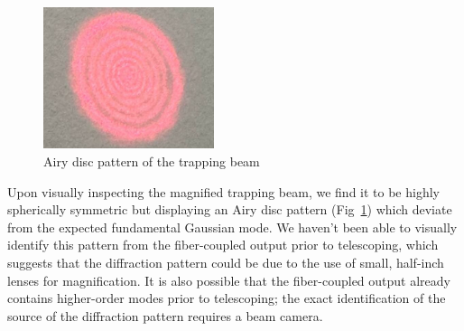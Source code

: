 \documentclass[aps,prb,twocolumn,superscriptaddress,floatfix,longbibliography,citeautoscript]{revtex4-2}
\begin{document}
\begin{figure}
    \centering
    \includegraphics[width=5cm]{Second_draft/figs/airy_pattern.jpg}
    \caption{Airy disc pattern of the trapping beam}
    \label{fig:airy}
\end{figure}
Upon visually inspecting the magnified trapping beam, we find it to be highly spherically symmetric but displaying an Airy disc pattern 
(Fig~\ref{fig:airy}) which deviate from the expected fundamental Gaussian mode. 
We haven't been able to visually identify this pattern from the fiber-coupled 
output prior to telescoping, which suggests that the diffraction pattern could be due to the use of small, half-inch lenses for magnification. 
It is also possible that the fiber-coupled output already contains higher-order modes prior to telescoping; the exact identification of the source of the diffraction pattern requires a beam camera. 
\end{document}

